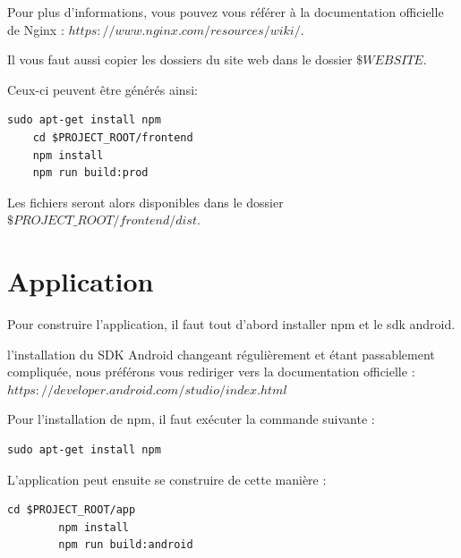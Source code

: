 \documentclass[french]{article}
\begin{document}
	Pour plus d'informations, vous pouvez vous référer à la documentation officielle de Nginx : $https://www.nginx.com/resources/wiki/$.
	
	
	Il vous faut aussi copier les dossiers du site web dans le dossier $\$WEBSITE$.
	
	Ceux-ci peuvent être générés ainsi:
	
	\begin{lstlisting}[style=py]
	sudo apt-get install npm
	cd $PROJECT_ROOT/frontend
	npm install
	npm run build:prod
	\end{lstlisting}
	
	Les fichiers seront alors disponibles dans le dossier $\$PROJECT\_ROOT/frontend/dist$.


	\section{Application}
	
	Pour construire l'application, il faut tout d'abord installer npm et le sdk android.
	
	l'installation du SDK Android changeant régulièrement et étant passablement compliquée, nous préférons vous rediriger vers la documentation officielle : $https://developer.android.com/studio/index.html$
	
	Pour l'installation de npm, il faut exécuter la commande suivante :
	
	\begin{lstlisting}[style=py]
	sudo apt-get install npm
	\end{lstlisting}
	
	L'application peut ensuite se construire de cette manière :
	
	\begin{lstlisting}[style=py]
		cd $PROJECT_ROOT/app
		npm install
		npm run build:android
	\end{lstlisting}
\end{document}

